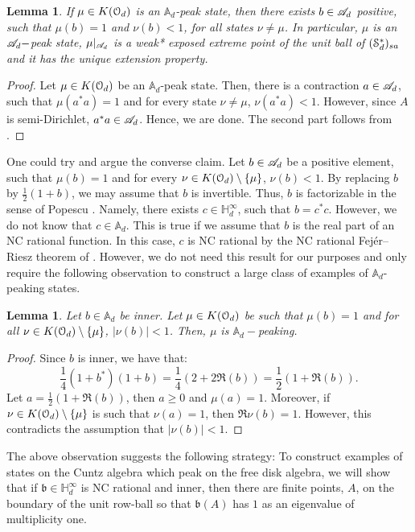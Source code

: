 \documentclass{article}
\newtheorem{lem}[thm]{Lemma}
\theoremstyle{definition}
\theoremstyle{remark}
\numberwithin{equation}{section}
\newcommand{\scr}{\ensuremath{\mathscr}}
\newcommand{\cuntz}{\ensuremath{\cO_d}}
\def\fb{\mathfrak{b}}
\def\bH{\mathbb{H}}
\def\A{\mathbb{A} _d}
\def\mult{\mathbb{H} ^\infty _d}
\begin{document}
\begin{lem} \label{lem:exposed}
If $\mu \in K(\cuntz)$ is an $\A$-peak state, then there exists $b \in \scr{A}_d$ positive, such that $\mu(b) = 1$ and $\nu(b) < 1$, for all states $\nu \neq \mu$. In particular, $\mu$ is an $\scr{A} _d-$peak state, $\mu|_{\scr{A}_d}$ is a weak* exposed extreme point of the unit ball of $({\mathcal S}_d^*)_{sa}$ and it has the unique extension property. 
\end{lem}
\begin{proof}
Let $\mu \in K(\cuntz)$ be an $\A$-peak state. Then, there is a contraction $a \in \scr{A} _d$, such that $\mu(a^* a) = 1$ and for every state $\nu \neq \mu$, $\nu(a^* a) < 1$. However, since $A$ is semi-Dirichlet, $a^* a \in \scr{A}_d$. Hence, we are done. The second part follows from \cite[Theorem 3.2]{Clouatre-peaking}.
\end{proof}

One could try and argue the converse claim. Let $b \in \scr{A}_d$ be a positive element, such that $\mu(b) = 1$ and for every $\nu \in K(\cuntz) \setminus \{\mu\}$, $\nu(b) < 1$. By replacing $b$ by $\frac{1}{2}(1 + b)$, we may assume that $b$ is invertible. Thus, $b$ is factorizable in the sense of Popescu \cite{Pop-factor}. Namely, there exists $c \in \bH^{\infty}_d$, such that $b = c^* c$. However, we do not know that $c \in \A$. This is true if we assume that $b$ is the real part of an NC rational function. In this case, $c$ is NC rational by the NC rational Fej\'er--Riesz theorem of \cite[Theorem 6.5]{JM-subFock}. However, we do not need this result for our purposes and only require the following observation to construct a large class of examples of $\A$-peaking states.
\begin{lem}
Let $b \in \A$ be inner. Let $\mu \in K(\cuntz)$ be such that $\mu(b) = 1$ and for all $\nu \in K(\cuntz) \setminus \{\mu\}$, $|\nu(b)| < 1$. Then, $\mu$ is $\A-$peaking.
\end{lem}
\begin{proof}
Since $b$ is inner, we have that:
\[
\frac{1}{4} (1 + b^*) (1 + b) = \frac{1}{4}(2 + 2 \Re(b)) = \frac{1}{2}(1 + \Re(b)).
\]
Let $a = \frac{1}{2}(1 + \Re(b))$, then $a \geq 0$ and $\mu(a) = 1$. Moreover, if $\nu \in K(\cuntz) \setminus \{\mu\}$ is such that $\nu(a) = 1$, then $\Re \nu(b) = 1$. However, this contradicts the assumption that $|\nu(b)| < 1$.
\end{proof}

The above observation suggests the following strategy: To construct examples of states on the Cuntz algebra which peak on the free disk algebra, we will show that if $\fb \in \mult$ is NC rational and inner, then there are finite points, $A$, on the boundary of the unit row-ball so that $\fb (A)$ has $1$ as an eigenvalue of multiplicity one.
\end{document}
